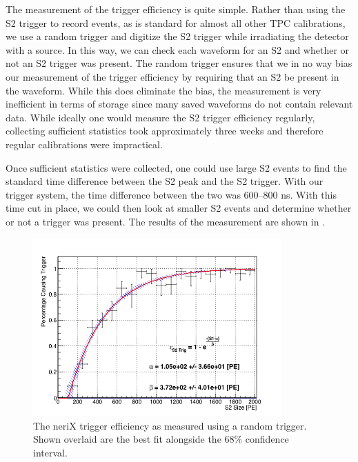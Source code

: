 The measurement of the trigger efficiency is quite simple.  Rather than using the S2 trigger to record events, as is standard for almost all other TPC calibrations, we use a random trigger and digitize the S2 trigger while irradiating the detector with a \sodium{} source.  In this way, we can check each waveform for an S2 and whether or not an S2 trigger was present.  The random trigger ensures that we in no way bias our measurement of the trigger efficiency by requiring that an S2 be present in the waveform.  While this does eliminate the bias, the measurement is very inefficient in terms of storage since many saved waveforms do not contain relevant data.  While ideally one would measure the S2 trigger efficiency regularly, collecting sufficient statistics took approximately three weeks and therefore regular calibrations were impractical.

Once sufficient statistics were collected, one could use large S2 events to find the standard time difference between the S2 peak and the S2 trigger.  With our trigger system, the time difference between the two was 600--800 ns.  With this time cut in place, we could then look at smaller S2 events and determine whether or not a trigger was present.  The results of the measurement are shown in .

\begin{figure}[t]
        \centering
	\includegraphics[width=0.85\textwidth]{nerix_trigger_efficiency}
	\caption{The neriX trigger efficiency as measured using a random trigger.  Shown overlaid are the best fit alongside the 68\% confidence interval.}
	\label{fig:nerix_trigger_efficiency}
\end{figure}



